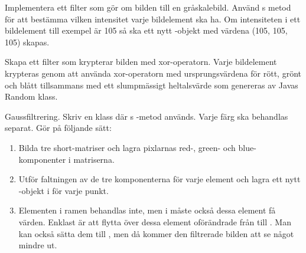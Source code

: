 \Task Implementera ett filter som gör om bilden till en gråskalebild. Använd s  metod för att bestämma vilken intensitet varje bildelement ska ha. Om intensiteten i ett bildelement till exempel är 105 så ska ett nytt -objekt med värdena (105, 105, 105) skapas.

\Task Skapa ett filter som krypterar bilden med xor-operatorn. Varje bildelement krypteras genom att använda xor-operatorn med ursprungsvärdena för rött, grönt och blått tillsammans med ett slumpmässigt heltalsvärde som genereras av Javas Random klass.

\Task Gaussfiltrering. Skriv en klass  där s -metod används. Varje färg ska behandlas separat. Gör på följande sätt:
\begin{enumerate}
	\item Bilda tre short-matriser och lagra pixlarnas red-, green- och blue-komponenter i matriserna.
	\item Utför faltningen av de tre komponenterna för varje element och lagra ett nytt -objekt i  för varje punkt.
	\item Elementen i ramen behandlas inte, men i  måste också dessa element få värden. Enklast är att flytta över dessa element oförändrade från  till . Man kan också sätta dem till , men då kommer den filtrerade bilden att se något mindre ut.
\end{enumerate}

